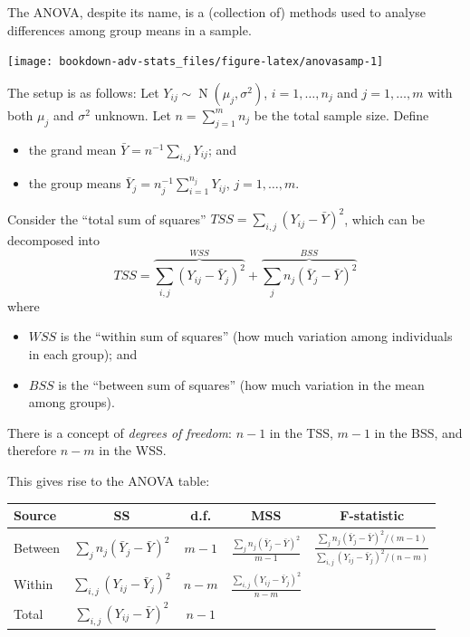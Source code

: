 \documentclass[
]{book}
\providecommand{\tightlist}{%
  \setlength{\itemsep}{0pt}\setlength{\parskip}{0pt}}
\DeclareMathOperator{\N}{N}
\theoremstyle{definition}
\theoremstyle{definition}
\theoremstyle{definition}
\theoremstyle{definition}
\theoremstyle{remark}
\begin{document}
The ANOVA, despite its name, is a (collection of) methods used to analyse differences among group means in a sample.

\begin{center}\texttt{[image: bookdown-adv-stats\_files/figure-latex/anovasamp-1]} \end{center}

The setup is as follows:
Let \(Y_{ij}\sim\N(\mu_j,\sigma^2)\), \(i=1,\dots,n_j\) and \(j=1,\dots,m\) with both \(\mu_j\) and \(\sigma^2\) unknown.
Let \(n=\sum_{j=1}^m n_j\) be the total sample size.
Define

\begin{itemize}
\tightlist
\item
  the grand mean \(\bar Y = n^{-1}\sum_{i,j} Y_{ij}\); and
\item
  the group means \(\bar Y_j = n_j^{-1} \sum_{i=1}^{n_j} Y_{ij}\), \(j=1,\dots,m\).
\end{itemize}

Consider the ``total sum of squares'' \(TSS = \sum_{i,j}(Y_{ij} - \bar Y)^2\), which can be decomposed into \[TSS = 
  \overbrace{\sum_{i,j} (Y_{ij} - \bar Y_j)^2}^{WSS} +
  \overbrace{\sum_{j} n_j(\bar Y_j - \bar Y)^2}^{BSS}\] where

\begin{itemize}
\tightlist
\item
  \(WSS\) is the ``within sum of squares'' (how much variation among individuals
  in each group); and
\item
  \(BSS\) is the ``between sum of squares'' (how much
  variation in the mean among groups).
\end{itemize}

There is a concept of \emph{degrees of freedom}: \(n-1\) in the TSS, \(m-1\) in
the BSS, and therefore \(n-m\) in the WSS.

This gives rise to the ANOVA table:

\begin{longtable}[]{@{}lcccc@{}}
\toprule
Source & SS & d.f. & MSS & F-statistic \\
\midrule
\endhead
Between & \(\sum_{j} n_j(\bar Y_j - \bar Y)^2\) & \(m-1\) & \(\frac{\sum_{j} n_j(\bar Y_j - \bar Y)^2}{m-1}\) & \(\frac{\sum_{j} n_j(\bar Y_j - \bar Y)^2/(m-1)}{\sum_{i,j} (Y_{ij} - \bar Y_j)^2/(n-m)}\) \\
Within & \(\sum_{i,j} (Y_{ij} - \bar Y_j)^2\) & \(n-m\) & \(\frac{\sum_{i,j} (Y_{ij} - \bar Y_j)^2}{n-m}\) & \\
Total & \(\sum_{i,j}(Y_{ij} - \bar Y)^2\) & \(n-1\) & & \\
\bottomrule
\end{longtable}
\end{document}
